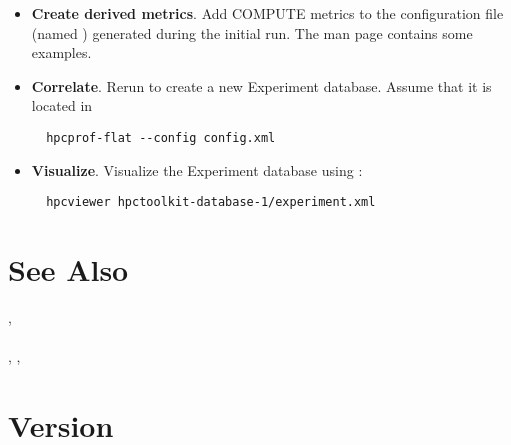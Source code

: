 \documentclass[english]{article}
\begin{document}
\begin{itemize}
\item \textbf{Create derived metrics}.  Add COMPUTE metrics to the  configuration file (named ) generated during the initial run.  The  man page contains some examples. 

\item \textbf{Correlate}. Rerun  to create a new Experiment database.  Assume that it is located in 
\begin{verbatim}
  hpcprof-flat --config config.xml
\end{verbatim}

\item \textbf{Visualize}.
Visualize the Experiment database using :
\begin{verbatim}
  hpcviewer hpctoolkit-database-1/experiment.xml
\end{verbatim}

\end{itemize}



\section{See Also}

,  \\
 \\
, ,  \\

\section{Version}
\end{document}
